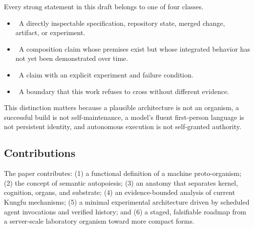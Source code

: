 Every strong statement in this draft belongs to one of four classes.

\begin{itemize}[leftmargin=*]
  \item \factlabel\ A directly inspectable specification, repository state,
  merged change, artifact, or experiment.
  \item \inferencelabel\ A composition claim whose premises exist but whose
  integrated behavior has not yet been demonstrated over time.
  \item \hypothesislabel\ A claim with an explicit experiment and failure
  condition.
  \item \nonclaimlabel\ A boundary that this work refuses to cross without
  different evidence.
\end{itemize}

This distinction matters because a plausible architecture is not an organism,
a successful build is not self-maintenance, a model's fluent first-person
language is not persistent identity, and autonomous execution is not
self-granted authority.

\subsection{Contributions}

The paper contributes: (1) a functional definition of a machine
proto-organism; (2) the concept of semantic autopoiesis; (3) an anatomy that
separates kernel, cognition, organs, and substrate; (4) an evidence-bounded
analysis of current Kungfu mechanisms; (5) a minimal experimental
architecture driven by scheduled agent invocations and verified history; and
(6) a staged, falsifiable roadmap from a server-scale laboratory organism
toward more compact forms.
